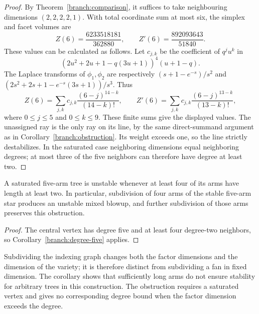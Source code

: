 \begin{proof}
By Theorem~\ref{branch:comparison}, it suffices to take neighbouring
dimensions $(2,2,2,2,1)$. With total coordinate sum at most six, the
simplex and facet volumes are
\[
 Z(6)=\frac{6233518181}{362880},\qquad
 Z'(6)=\frac{892093643}{51840}.
\]
These values can be calculated as follows. Let $c_{j,k}$ be
the coefficient of $q^ju^k$ in
\[
 (2u^2+2u+1-q(3u+1))^4(u+1-q).
\]
The Laplace transforms of $\phi_1,\phi_2$ are respectively
$(s+1-e^{-s})/s^2$ and
$(2s^2+2s+1-e^{-s}(3s+1))/s^3$. Thus
\[
 Z(6)=\sum_{j,k}c_{j,k}\frac{(6-j)^{14-k}}{(14-k)!},\qquad
 Z'(6)=\sum_{j,k}c_{j,k}\frac{(6-j)^{13-k}}{(13-k)!},
\]
where $0\le j\le5$ and $0\le k\le9$. These finite sums give the displayed
values. The unassigned ray is the only ray on its line, by the same
direct-summand argument as in Corollary~\ref{branch:obstruction}.
Its weight exceeds one, so the line strictly destabilizes.
In the saturated case neighboring dimensions equal neighboring degrees;
at most three of the five neighbors can therefore have degree at least two.
\end{proof}

\begin{corollary}\label{branch:subdivision}
A saturated five-arm tree is unstable whenever at least four of its arms
have length at least two. In particular, subdivision of four arms of the
stable five-arm star produces an unstable mixed blowup, and further
subdivision of those arms preserves this obstruction.
\end{corollary}

\begin{proof}
The central vertex has degree five and at least four degree-two neighbors,
so Corollary~\ref{branch:degree-five} applies.
\end{proof}

Subdividing the indexing graph changes both the factor dimensions and
the dimension of the variety; it is therefore distinct from subdividing
a fan in fixed dimension. The corollary shows that sufficiently long
arms do not ensure stability for arbitrary trees in this construction.
The obstruction requires a saturated vertex and gives no corresponding
degree bound when the factor dimension exceeds the degree.
